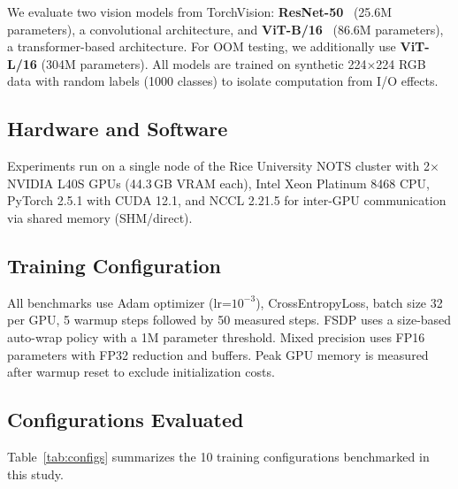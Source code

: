 \documentclass[sigconf]{acmart}
\begin{document}
We evaluate two vision models from TorchVision: \textbf{ResNet-50}~\cite{he2016resnet} (25.6M parameters), a convolutional architecture, and \textbf{ViT-B/16}~\cite{dosovitskiy2021vit} (86.6M parameters), a transformer-based architecture. For OOM testing, we additionally use \textbf{ViT-L/16} (304M parameters). All models are trained on synthetic 224$\times$224 RGB data with random labels (1000 classes) to isolate computation from I/O effects.

\subsection{Hardware and Software}

Experiments run on a single node of the Rice University NOTS cluster with 2$\times$ NVIDIA L40S GPUs (44.3\,GB VRAM each), Intel Xeon Platinum 8468 CPU, PyTorch 2.5.1 with CUDA 12.1, and NCCL 2.21.5 for inter-GPU communication via shared memory (SHM/direct).

\subsection{Training Configuration}

All benchmarks use Adam optimizer (lr=$10^{-3}$), CrossEntropyLoss, batch size 32 per GPU, 5 warmup steps followed by 50 measured steps. FSDP uses a size-based auto-wrap policy with a 1M parameter threshold. Mixed precision uses FP16 parameters with FP32 reduction and buffers. Peak GPU memory is measured after warmup reset to exclude initialization costs.

\subsection{Configurations Evaluated}

Table~\ref{tab:configs} summarizes the 10 training configurations benchmarked in this study.
\end{document}
